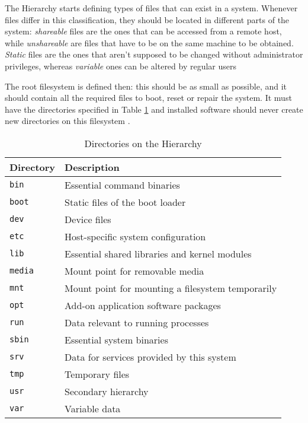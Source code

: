 The Hierarchy starts defining types of files that can exist in a system. Whenever files differ in this classification, they should be located in different parts of the system: \textit{shareable} files are the ones that can be accessed from a remote host, while \textit{unshareable} are files that have to be on the same machine to be obtained. \textit{Static} files are the ones that aren't supposed to be changed without administrator privileges, whereas \textit{variable} ones can be altered by regular users \cite{bandel2001special}

The root filesystem is defined then: this should be as small as possible, and it should contain all the required files to boot, reset or repair the system. It must have the directories specified in Table \ref{tab:directories} and installed software should never create new directories on this filesystem \cite{allbery2015filesystem}.


\begin{table}[h!]
\centering
\caption{Directories on the Hierarchy \cite{allbery2015filesystem}}
\label{tab:directories}
\begin{tabular}{ll}
\toprule
\textbf{Directory} & \textbf{Description} \\
\midrule
\texttt{bin} & Essential command binaries \\
\texttt{boot} & Static files of the boot loader \\
\texttt{dev} & Device files \\
\texttt{etc} & Host-specific system configuration \\
\texttt{lib} & Essential shared libraries and kernel modules \\
\texttt{media} & Mount point for removable media \\
\texttt{mnt} & Mount point for mounting a filesystem temporarily \\
\texttt{opt} & Add-on application software packages \\
\texttt{run} & Data relevant to running processes \\
\texttt{sbin} & Essential system binaries \\
\texttt{srv} & Data for services provided by this system \\
\texttt{tmp} & Temporary files \\
\texttt{usr} & Secondary hierarchy \\
\texttt{var} & Variable data \\
\bottomrule
\end{tabular}
\end{table}


